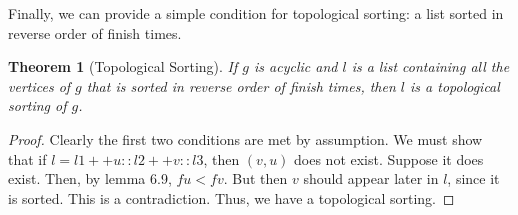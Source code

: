 \documentclass{article}
\newtheorem{theorem}{Theorem}[section]
\begin{document}
Finally, we can provide a simple condition for topological sorting: a list sorted in reverse order of finish times.
\begin{theorem}[Topological Sorting]
If $g$ is acyclic and $l$ is a list containing all the vertices of $g$ that is sorted in reverse order of finish times, then $l$ is a topological sorting of $g$.
\end{theorem}
\begin{proof}
Clearly the first two conditions are met by assumption. We must show that if $l = l1 ++ u :: l2 ++ v :: l3$, then $(v,u)$ does not exist. Suppose it does exist. Then, by lemma 6.9, $fu < fv$. But then $v$ should appear later in $l$, since it is sorted. This is a contradiction. Thus, we have a topological sorting.
\end{proof}
\end{document}
